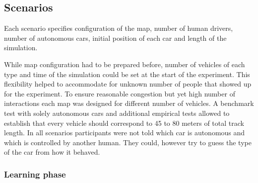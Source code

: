 \documentclass[11pt,english]{article}
\begin{document}




\subsection{Scenarios}

Each scenario specifies configuration of the map, number of human drivers, number of autonomous cars, initial position of each car and length of the simulation. 

While map configuration had to be prepared before, number of vehicles of each type and time of the simulation could be set at the start of the experiment. This flexibility helped to accommodate for unknown number of people that showed up for the experiment. To ensure reasonable congestion but yet high number of interactions each map was designed for different number of vehicles. A benchmark test with solely autonomous cars and additional empirical tests allowed to establish that every vehicle should correspond to 45 to 80 meters of total track length. In all scenarios participants were not told which car is autonomous and which is controlled by another human. They could, however try to guess the type of the car from how it behaved. 

\par


\subsubsection{Learning phase}
\end{document}
